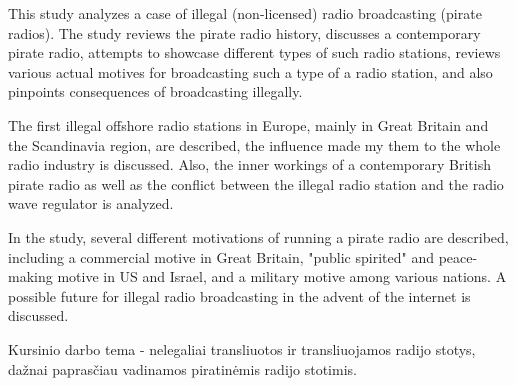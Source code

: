 \documentclass[kursinis-darbas]{vukf}
\begin{document}
\begin{vukfAbstractEn}

This study analyzes a case of illegal (non-licensed) radio broadcasting (pirate radios). The study reviews the pirate radio history, discusses a contemporary pirate radio, attempts to showcase different types of such radio stations, reviews various actual motives for broadcasting such a type of a radio station, and also pinpoints consequences of broadcasting illegally.

The first illegal offshore radio stations in Europe, mainly in Great Britain and the Scandinavia region, are described, the influence made my them to the whole radio industry is discussed. Also, the inner workings of a contemporary British pirate radio as well as the conflict between the illegal radio station and the radio wave regulator is analyzed.

In the study, several different motivations of running a pirate radio are described, including a commercial motive in Great Britain, "public spirited" and peace-making motive in US and Israel, and a military motive among various nations. A possible future for illegal radio broadcasting in the advent of the internet is discussed.

\end{vukfAbstractEn}


%
%





%
%

\vukfIntroduction


Kursinio darbo tema - nelegaliai transliuotos ir transliuojamos radijo stotys, dažnai paprasčiau vadinamos piratinėmis radijo stotimis.
\end{document}
